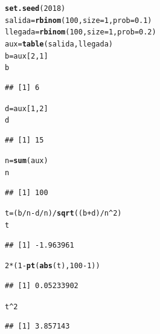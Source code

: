 \documentclass[10pt]{article}\usepackage[]{graphicx}\usepackage[]{color}
\makeatletter
\newcommand{\hlnum}[1]{\textcolor[rgb]{0.686,0.059,0.569}{#1}}%
\newcommand{\hlopt}[1]{\textcolor[rgb]{0,0,0}{#1}}%
\newcommand{\hlstd}[1]{\textcolor[rgb]{0.345,0.345,0.345}{#1}}%
\newcommand{\hlkwb}[1]{\textcolor[rgb]{0.69,0.353,0.396}{#1}}%
\newcommand{\hlkwc}[1]{\textcolor[rgb]{0.333,0.667,0.333}{#1}}%
\newcommand{\hlkwd}[1]{\textcolor[rgb]{0.737,0.353,0.396}{\textbf{#1}}}%
\newenvironment{kframe}{%
 \def\at@end@of@kframe{}%
 \ifinner\ifhmode%
  \def\at@end@of@kframe{\end{minipage}}%
  \begin{minipage}{\columnwidth}%
 \fi\fi%
 \def\FrameCommand##1{\hskip\@totalleftmargin \hskip-\fboxsep
 \colorbox{shadecolor}{##1}\hskip-\fboxsep
     \hskip-\linewidth \hskip-\@totalleftmargin \hskip\columnwidth}%
 \MakeFramed {\advance\hsize-\width
   \@totalleftmargin\z@ \linewidth\hsize
   \@setminipage}}%
 {\par\unskip\endMakeFramed%
 \at@end@of@kframe}
\newenvironment{knitrout}{}{} %
\makeatother
\begin{document}
\begin{knitrout}
\color{fgcolor}\begin{kframe}
\begin{alltt}
\hlkwd{set.seed}\hlstd{(}\hlnum{2018}\hlstd{)}
\hlstd{salida} \hlkwb{=}\hlkwd{rbinom}\hlstd{(}\hlnum{100}\hlstd{,}\hlkwc{size}\hlstd{=}\hlnum{1}\hlstd{,}\hlkwc{prob}\hlstd{=}\hlnum{0.1}\hlstd{)}
\hlstd{llegada}\hlkwb{=}\hlkwd{rbinom}\hlstd{(}\hlnum{100}\hlstd{,}\hlkwc{size}\hlstd{=}\hlnum{1}\hlstd{,}\hlkwc{prob}\hlstd{=}\hlnum{0.2}\hlstd{)}
\hlstd{aux}\hlkwb{=}\hlkwd{table}\hlstd{(salida,llegada)}
\hlstd{b}\hlkwb{=}\hlstd{aux[}\hlnum{2}\hlstd{,}\hlnum{1}\hlstd{]}
\hlstd{b}
\end{alltt}
\begin{verbatim}
## [1] 6
\end{verbatim}
\begin{alltt}
\hlstd{d}\hlkwb{=}\hlstd{aux[}\hlnum{1}\hlstd{,}\hlnum{2}\hlstd{]}
\hlstd{d}
\end{alltt}
\begin{verbatim}
## [1] 15
\end{verbatim}
\begin{alltt}
\hlstd{n}\hlkwb{=}\hlkwd{sum}\hlstd{(aux)}
\hlstd{n}
\end{alltt}
\begin{verbatim}
## [1] 100
\end{verbatim}
\begin{alltt}
\hlstd{t}\hlkwb{=}\hlstd{(b}\hlopt{/}\hlstd{n}\hlopt{-}\hlstd{d}\hlopt{/}\hlstd{n)}\hlopt{/}\hlkwd{sqrt}\hlstd{((b}\hlopt{+}\hlstd{d)}\hlopt{/}\hlstd{n}\hlopt{^}\hlnum{2}\hlstd{)}
\hlstd{t}
\end{alltt}
\begin{verbatim}
## [1] -1.963961
\end{verbatim}
\begin{alltt}
\hlnum{2}\hlopt{*}\hlstd{(}\hlnum{1}\hlopt{-}\hlkwd{pt}\hlstd{(}\hlkwd{abs}\hlstd{(t),}\hlnum{100}\hlopt{-}\hlnum{1}\hlstd{))}
\end{alltt}
\begin{verbatim}
## [1] 0.05233902
\end{verbatim}
\begin{alltt}
\hlstd{t}\hlopt{^}\hlnum{2}
\end{alltt}
\begin{verbatim}
## [1] 3.857143
\end{verbatim}
\end{kframe}
\end{knitrout}
\end{document}

